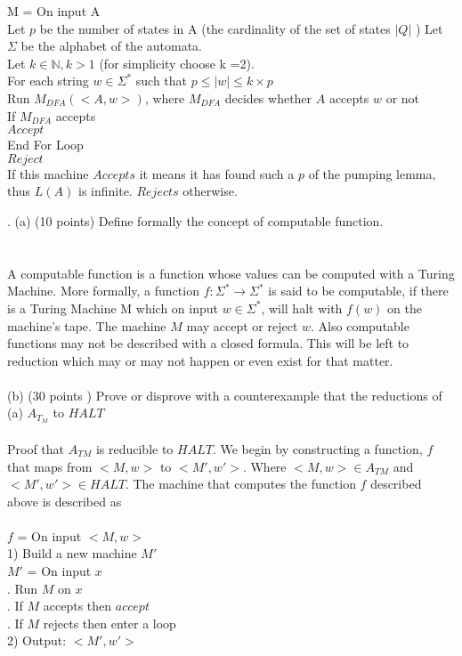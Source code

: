 \documentclass{report}
\newcommand{\me}[1]{
\begin{math}
#1
\end{math}
}
\begin{document}
 M = On input A \\
  Let $p$ be the number of states in A (the cardinality of the set of states \me{|Q|})
  Let $\Sigma$ be the alphabet of the automata. \\
  Let $k \in \mathbb{N}, k>1$ (for simplicity choose k =2).\\
  For each string \me{w \in \Sigma^*} such that \me{p \leq |w| \leq k\times p}\\
  \indent Run $M_{DFA}(<A,w>)$, where $M_{DFA}$ decides whether $A$ accepts $w$ or not \\
  \indent If $M_{DFA}$ accepts\\ 
  \indent \indent $Accept$ \\
  End For Loop \\
  $Reject$ \\
  
  If this machine $Accepts$ it means it has found such a $p$ of the pumping lemma, thus $L(A)$ is infinite. $Rejects$ otherwise.
  



. (a) (10 points) Define formally the concept of computable function. \\\\
\\
A computable function is a function whose values can be computed with a Turing Machine. More formally, a function \me{f:\Sigma^* \to \Sigma^*} is said to be computable, if there is a Turing Machine M which on input $w \in \Sigma^*$, will halt with $f(w)$ on the machine's tape. The machine $M$ may accept or reject $w$. Also computable functions may not be described with a closed formula. This will be left to reduction which may or may not happen or even exist for that matter. \\ \\



(b) (30 points ) Prove or disprove with a counterexample that the reductions of \\
\indent (a) $ A_{T_M}$ to $HALT $\\ \\ Proof that $A_{TM}$ is reducible to $HALT$. We begin by constructing a function, $f$ that maps from $<M,w>$ to $<M',w'>$. Where $<M,w> \in A_{TM}$ and $<M',w'> \in HALT$. The machine that computes the function $f$ described above is described as \\ \\
$f$ = On input $<M,w>$ \\
1) Build a new machine $M'$ \\
$M'$ = On input $x$ \\
. Run $M$ on $x$ \\
. If $M$ accepts then $accept$\\
. If $M$ rejects then enter a loop\\
2) Output: $<M',w'>$  \\
\end{document}
